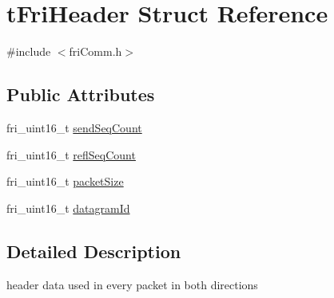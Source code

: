 \hypertarget{structtFriHeader}{\section{t\-Fri\-Header \-Struct \-Reference}
\label{structtFriHeader}
}


{\ttfamily \#include $<$fri\-Comm.\-h$>$}

\subsection*{\-Public \-Attributes}
\begin{DoxyCompactItemize}
\item 
fri\-\_\-uint16\-\_\-t \hyperlink{structtFriHeader_a37b742fa9c012d740ffdbd54fa49e094}{send\-Seq\-Count}
\item 
fri\-\_\-uint16\-\_\-t \hyperlink{structtFriHeader_acc7e2afb407587e0f02776cdf53d8ab7}{refl\-Seq\-Count}
\item 
fri\-\_\-uint16\-\_\-t \hyperlink{structtFriHeader_acb8028f4bd6d620707e8f8cda3ebe3f9}{packet\-Size}
\item 
fri\-\_\-uint16\-\_\-t \hyperlink{structtFriHeader_a153933e518d1ce6c8ae70cde7a936938}{datagram\-Id}
\end{DoxyCompactItemize}


\subsection{\-Detailed \-Description}
header data used in every packet in both directions 

